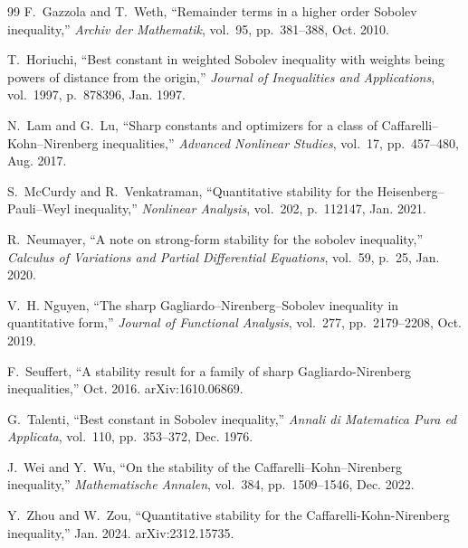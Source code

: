\documentclass[11pt]{article}
\numberwithin{equation}{section}
\begin{document}
\begin{thebibliography}{99}
F.~Gazzola and T.~Weth, ``Remainder terms in a higher order {Sobolev}
  inequality,'' {\em Archiv der Mathematik}, vol.~95, pp.~381--388, Oct. 2010.




T.~Horiuchi, ``Best constant in weighted {Sobolev} inequality with weights
  being powers of distance from the origin,'' {\em Journal of Inequalities and
  Applications}, vol.~1997, p.~878396, Jan. 1997.





N.~Lam and G.~Lu, ``Sharp constants and optimizers for a class of
  {Caffarelli--Kohn--Nirenberg} inequalities,'' {\em Advanced Nonlinear
  Studies}, vol.~17, pp.~457--480, Aug. 2017.

S.~McCurdy and R.~Venkatraman, ``Quantitative stability for the
  {Heisenberg--Pauli--Weyl} inequality,'' {\em Nonlinear Analysis}, vol.~202,
  p.~112147, Jan. 2021.


R.~Neumayer, ``A note on strong-form stability for the sobolev inequality,''
  {\em Calculus of Variations and Partial Differential Equations}, vol.~59,
  p.~25, Jan. 2020.



V.~H. Nguyen, ``The sharp {Gagliardo--Nirenberg--Sobolev} inequality in
  quantitative form,'' {\em Journal of Functional Analysis}, vol.~277,
  pp.~2179--2208, Oct. 2019.







F.~Seuffert, ``A stability result for a family of sharp {Gagliardo-Nirenberg}
  inequalities,'' Oct. 2016.
\newblock arXiv:1610.06869.



G.~Talenti, ``Best constant in {Sobolev} inequality,'' {\em Annali di
  Matematica Pura ed Applicata}, vol.~110, pp.~353--372, Dec. 1976.




J.~Wei and Y.~Wu, ``On the stability of the {Caffarelli--Kohn--Nirenberg}
  inequality,'' {\em Mathematische Annalen}, vol.~384, pp.~1509--1546, Dec.
  2022.




Y.~Zhou and W.~Zou, ``Quantitative stability for the
  {Caffarelli-Kohn-Nirenberg} inequality,'' Jan. 2024.
\newblock arXiv:2312.15735.








\end{thebibliography}







%
\end{document}
